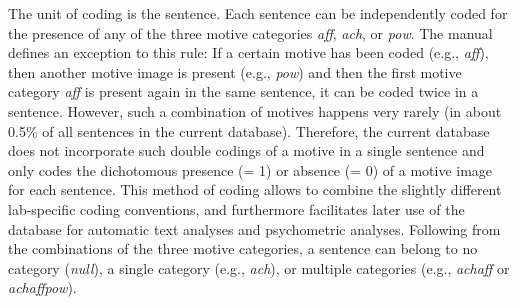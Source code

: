 \documentclass[man,a4paper,mask]{apa6}
\newcommand{\added}[1]{#1}
\begin{document}
The unit of coding is the sentence. Each sentence can be independently coded for the presence of any of the three motive categories \emph{aff}, \emph{ach}, or \emph{pow}. The manual defines an exception to this rule: If a certain motive has been coded (e.g., \emph{aff}), then another motive image is present (e.g., \emph{pow}) and then the first motive category \emph{aff} is present again in the same sentence, it can be coded twice in a sentence. \added{However, such a combination of motives happens very rarely (in about 0.5\% of all sentences in the current database). Therefore, the current database does not incorporate such double codings of a motive in a single sentence and only codes the dichotomous presence (= 1) or absence (= 0) of a motive image for each sentence. This method of coding allows to combine the slightly different lab-specific coding conventions, and furthermore facilitates later use of the database for automatic text analyses and psychometric analyses.} 
Following from the combinations of the three motive categories, a sentence can belong to no category (\emph{null}), a single category (e.g., \emph{ach}), or multiple categories (e.g., \emph{achaff} or \emph{achaffpow}).
\end{document}
